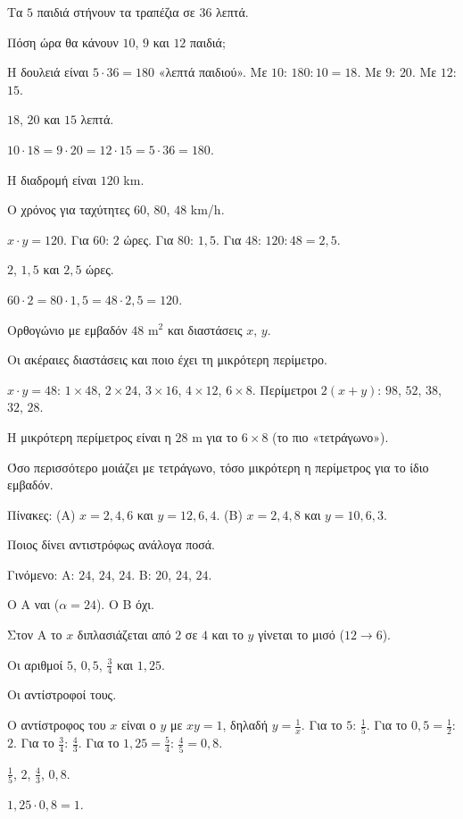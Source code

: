 
\tixero Τα $5$ παιδιά στήνουν τα τραπέζια σε $36$ λεπτά.\par
\tithelo Πόση ώρα θα κάνουν $10$, $9$ και $12$ παιδιά;\par
\possindeo Η δουλειά είναι $5\cdot36=180$ «λεπτά παιδιού». Με $10$: $180:10=18$. Με $9$: $20$. Με $12$: $15$.\par
\apantisi $18$, $20$ και $15$ λεπτά.\par
\elegxos $10\cdot18=9\cdot20=12\cdot15=5\cdot36=180$.

\tixero Η διαδρομή είναι $120$ km.\par
\tithelo Ο χρόνος για ταχύτητες $60$, $80$, $48$ km/h.\par
\possindeo $x\cdot y=120$. Για $60$: $2$ ώρες. Για $80$: $1{,}5$. Για $48$: $120:48=2{,}5$.\par
\apantisi $2$, $1{,}5$ και $2{,}5$ ώρες.\par
\elegxos $60\cdot2=80\cdot1{,}5=48\cdot2{,}5=120$.

\tixero Ορθογώνιο με εμβαδόν $48$ m$^2$ και διαστάσεις $x,\,y$.\par
\tithelo Οι ακέραιες διαστάσεις και ποιο έχει τη μικρότερη περίμετρο.\par
\possindeo $x\cdot y=48$: $1\times48$, $2\times24$, $3\times16$, $4\times12$, $6\times8$. Περίμετροι $2(x+y)$: $98$, $52$, $38$, $32$, $28$.\par
\apantisi Η μικρότερη περίμετρος είναι η $28$ m για το $6\times8$ (το πιο «τετράγωνο»).\par
\elegxos Όσο περισσότερο μοιάζει με τετράγωνο, τόσο μικρότερη η περίμετρος για το ίδιο εμβαδόν.

\tixero Πίνακες: (Α) $x=2,4,6$ και $y=12,6,4$. (Β) $x=2,4,8$ και $y=10,6,3$.\par
\tithelo Ποιος δίνει αντιστρόφως ανάλογα ποσά.\par
\possindeo Γινόμενο: Α: $24$, $24$, $24$. Β: $20$, $24$, $24$.\par
\apantisi Ο Α ναι ($\alpha=24$). Ο Β όχι.\par
\elegxos Στον Α το $x$ διπλασιάζεται από $2$ σε $4$ και το $y$ γίνεται το μισό ($12\to6$).

\tixero Οι αριθμοί $5$, $0{,}5$, $\frac{3}{4}$ και $1{,}25$.\par
\tithelo Οι αντίστροφοί τους.\par
\possindeo Ο αντίστροφος του $x$ είναι ο $y$ με $xy=1$, δηλαδή $y=\frac{1}{x}$. Για το $5$: $\frac{1}{5}$. Για το $0{,}5=\frac{1}{2}$: $2$. Για το $\frac{3}{4}$: $\frac{4}{3}$. Για το $1{,}25=\frac{5}{4}$: $\frac{4}{5}=0{,}8$.\par
\apantisi $\frac{1}{5}$, $2$, $\frac{4}{3}$, $0{,}8$.\par
\elegxos $1{,}25\cdot0{,}8=1$.

